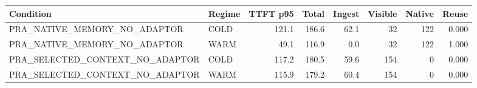 \begin{tabular}{llrrrrrr}
\toprule
Condition & Regime & TTFT p95 & Total & Ingest & Visible & Native & Reuse \\
\midrule
PRA\_NATIVE\_MEMORY\_NO\_ADAPTOR & COLD & 121.1 & 186.6 & 62.1 & 32 & 122 & 0.000 \\
PRA\_NATIVE\_MEMORY\_NO\_ADAPTOR & WARM & 49.1 & 116.9 & 0.0 & 32 & 122 & 1.000 \\
PRA\_SELECTED\_CONTEXT\_NO\_ADAPTOR & COLD & 117.2 & 180.5 & 59.6 & 154 & 0 & 0.000 \\
PRA\_SELECTED\_CONTEXT\_NO\_ADAPTOR & WARM & 115.9 & 179.2 & 60.4 & 154 & 0 & 0.000 \\
\bottomrule
\end{tabular}
